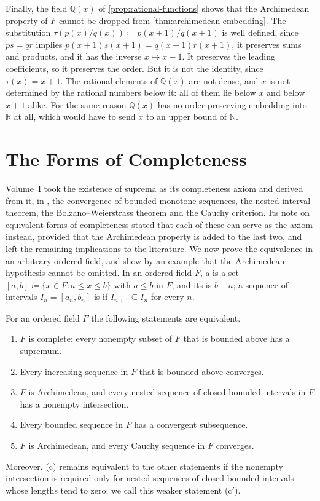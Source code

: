 Finally, the field $\mathbb Q(x)$ of \cref{prop:rational-functions} shows that the Archimedean property of $F$ cannot be dropped from \cref{thm:archimedean-embedding}. The substitution $\tau(p(x)/q(x))\coloneqq p(x+1)/q(x+1)$ is well defined, since $ps=qr$ implies $p(x+1)s(x+1)=q(x+1)r(x+1)$, it preserves sums and products, and it has the inverse $x\mapsto x-1$. It preserves the leading coefficients, so it preserves the order. But it is not the identity, since $\tau(x)=x+1$. The rational elements of $\mathbb Q(x)$ are not dense, and $x$ is not determined by the rational numbers below it: all of them lie below $x$ and below $x+1$ alike. For the same reason $\mathbb Q(x)$ has no order-preserving embedding into $\mathbb R$ at all, which would have to send $x$ to an upper bound of $\mathbb N$.

\section{The Forms of Completeness}
\label{sec:forms-completeness}

Volume~I took the existence of suprema as its completeness axiom and derived from it, in , the convergence of bounded monotone sequences, the nested interval theorem, the Bolzano--Weierstrass theorem and the Cauchy criterion. Its note on equivalent forms of completeness stated that each of these can serve as the axiom instead, provided that the Archimedean property is added to the last two, and left the remaining implications to the literature. We now prove the equivalence in an arbitrary ordered field, and show by an example that the Archimedean hypothesis cannot be omitted. In an ordered field $F$, a  is a set $[a,b]\coloneqq\{x\in F: a\le x\le b\}$ with $a\le b$ in $F$, and its  is $b-a$; a sequence of intervals $I_n=[a_n,b_n]$ is  if $I_{n+1}\subseteq I_n$ for every $n$.

\begin{theorem}
\label{thm:completeness-forms}
For an ordered field $F$ the following statements are equivalent.
\begin{enumerate}
\item[(a)] $F$ is complete: every nonempty subset of $F$ that is bounded above has a supremum.
\item[(b)] Every increasing sequence in $F$ that is bounded above converges.
\item[(c)] $F$ is Archimedean, and every nested sequence of closed bounded intervals in $F$ has a nonempty intersection.
\item[(d)] Every bounded sequence in $F$ has a convergent subsequence.
\item[(e)] $F$ is Archimedean, and every Cauchy sequence in $F$ converges.
\end{enumerate}
Moreover, (c) remains equivalent to the other statements if the nonempty intersection is required only for nested sequences of closed bounded intervals whose lengths tend to zero; we call this weaker statement (c$'$).
\end{theorem}

